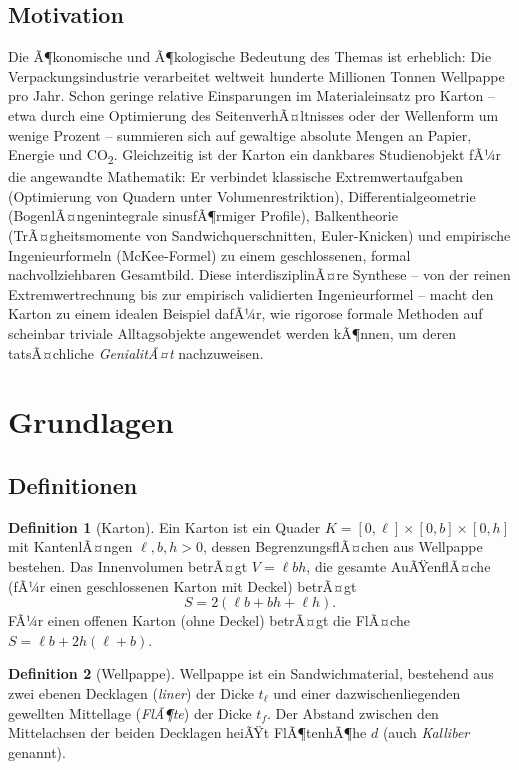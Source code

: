 ﻿\documentclass[a4paper,12pt]{article}
\theoremstyle{definition}
\newtheorem{definition}{Definition}
\begin{document}
\subsection{Motivation}

Die Ã¶konomische und Ã¶kologische Bedeutung des Themas ist erheblich: Die
Verpackungsindustrie verarbeitet weltweit hunderte Millionen Tonnen Wellpappe pro Jahr.
Schon geringe relative Einsparungen im Materialeinsatz pro Karton -- etwa durch eine
Optimierung des SeitenverhÃ¤ltnisses oder der Wellenform um wenige Prozent -- summieren
sich auf gewaltige absolute Mengen an Papier, Energie und CO\textsubscript{2}.
Gleichzeitig ist der Karton ein dankbares Studienobjekt fÃ¼r die angewandte Mathematik:
Er verbindet klassische Extremwertaufgaben (Optimierung von Quadern unter
Volumenrestriktion), Differentialgeometrie (BogenlÃ¤ngenintegrale sinusfÃ¶rmiger Profile),
Balkentheorie (TrÃ¤gheitsmomente von Sandwich\-querschnitten, Euler-Knicken) und
empirische Ingenieurformeln (McKee-Formel) zu einem geschlossenen, formal
nachvollziehbaren Gesamtbild. Diese interdisziplinÃ¤re Synthese -- von der reinen
Extremwertrechnung bis zur empirisch validierten Ingenieurformel -- macht den Karton zu
einem idealen Beispiel dafÃ¼r, wie rigorose formale Methoden auf scheinbar triviale
Alltagsobjekte angewendet werden kÃ¶nnen, um deren tatsÃ¤chliche \emph{GenialitÃ¤t}
nachzuweisen.

\section{Grundlagen}

\subsection{Definitionen}

\begin{definition}[Karton]
	Ein Karton ist ein Quader $K = [0,\ell] \times [0,b] \times [0,h]$ mit
	KantenlÃ¤ngen $\ell, b, h > 0$, dessen BegrenzungsflÃ¤chen aus Wellpappe bestehen.
	Das Innenvolumen betrÃ¤gt $V = \ell b h$, die gesamte AuÃŸenflÃ¤che (fÃ¼r einen
	geschlossenen Karton mit Deckel) betrÃ¤gt
	\[
		S = 2(\ell b + b h + \ell h).
	\]
	FÃ¼r einen offenen Karton (ohne Deckel) betrÃ¤gt die FlÃ¤che
	$S = \ell b + 2h(\ell + b)$.
\end{definition}

\begin{definition}[Wellpappe]
	Wellpappe ist ein Sandwichmaterial, bestehend aus zwei ebenen Decklagen
	(\emph{liner}) der Dicke $t_\ell$ und einer dazwischenliegenden gewellten
	Mittellage (\emph{FlÃ¶te}) der Dicke $t_f$. Der Abstand zwischen den
	Mittelachsen der beiden Decklagen heiÃŸt FlÃ¶tenhÃ¶he $d$ (auch
	\emph{Kalliber} genannt).
\end{definition}
\end{document}
